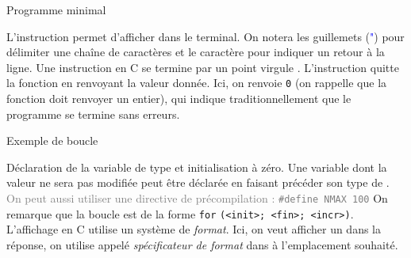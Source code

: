 \documentclass[10pt]{beamer}
\begin{document}
\begin{frame}[fragile]{\Ctitle}{\stitle}
\begin{exampleblock}{Programme minimal}
\begin{overprint}
			\medskip
			L'instruction  permet d'afficher dans le terminal. On notera les guillemets (\textcolor{blue}{"}) pour délimiter une chaîne de caractères et le caractère  pour indiquer un retour à la ligne. Une instruction en C se termine par un point virgule \kw{;}.
			\onslide<6>
			\medskip
			L'instruction  quitte la fonction en renvoyant la valeur donnée. Ici, on renvoie {\tt 0} (on rappelle que la fonction doit renvoyer un entier), qui indique traditionnellement que le programme se termine sans erreurs.
		\end{overprint}
	\end{exampleblock}

\end{frame}

\begin{frame}{\Ctitle}{\stitle}
	\begin{exampleblock}{Exemple de boucle}
		\begin{overprint}
		\medskip
		Déclaration de la variable  de type  et initialisation à zéro.
		\onslide<2>
		\medskip
		Une variable dont la valeur ne sera pas modifiée peut être déclarée  en faisant précéder son type de .\\
		\textcolor{gray}{On peut aussi utiliser une directive de précompilation : {\tt \#define NMAX 100}}
		\onslide<3>
		\medskip
		On remarque que la boucle  est de la forme {\tt for} {\tt(<init>; <fin>; <incr>)}.
		\onslide<4>
		L'affichage en C utilise un système de \textit{format}. Ici, on veut afficher un  dans la réponse, on utilise  appelé \textit{spécificateur de format} dans  à l'emplacement souhaité.
		\medskip
		\end{overprint}
	\end{exampleblock}
\end{frame}
\end{document}
